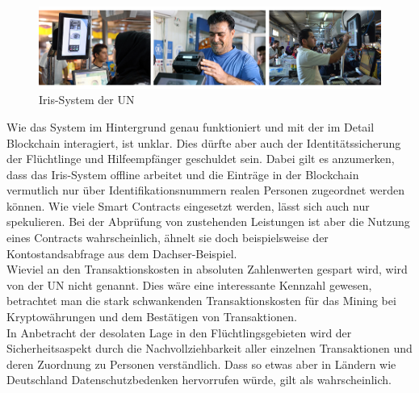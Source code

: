 \begin{figure}[h!]
  \centering
  \includegraphics[width=\textwidth]{Bilder/Iris-Scan.jpg}
  \caption[Iris-System der UN]{Iris-System der UN \cite{WTWebsite2019}}
  \label{fig:IrisSystem}
\end{figure}

Wie das System im Hintergrund genau funktioniert und mit der im Detail Blockchain interagiert, ist unklar. Dies dürfte aber auch der Identitätssicherung der Flüchtlinge und Hilfeempfänger geschuldet sein. Dabei gilt es anzumerken, dass das Iris-System offline arbeitet und die Einträge in der Blockchain vermutlich nur über Identifikationsnummern realen Personen zugeordnet werden können. Wie viele Smart Contracts eingesetzt werden, lässt sich auch nur spekulieren. Bei der Abprüfung von zustehenden Leistungen ist aber die Nutzung eines Contracts wahrscheinlich, ähnelt sie doch beispielsweise der Kontostandsabfrage aus dem Dachser-Beispiel.\\
Wieviel an den Transaktionskosten in absoluten Zahlenwerten gespart wird, wird von der UN nicht genannt. Dies wäre eine interessante Kennzahl gewesen, betrachtet man die stark schwankenden Transaktionskosten für das Mining bei Kryptowährungen und dem Bestätigen von Transaktionen. \\
In Anbetracht der desolaten Lage in den Flüchtlingsgebieten wird der Sicherheitsaspekt durch die Nachvollziehbarkeit aller einzelnen Transaktionen und deren Zuordnung zu Personen verständlich. Dass so etwas aber in Ländern wie Deutschland Datenschutzbedenken hervorrufen würde, gilt als wahrscheinlich.


